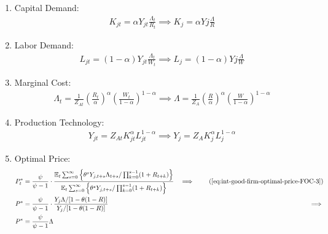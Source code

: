 \documentclass[
thesis.tex
]{subfiles}
\begin{document}
\begin{enumerate}
		\item Capital Demand:
		\begin{align}
			\label{eq:ss-int-good-firm-FOC-Kt}
			K_{jt} = \alpha Y_{jt} \frac{\Lambda_t}{R_t} \implies 
			K_{j} = \alpha Y{j} \frac{\Lambda}{R}
		\end{align}
		
		\item Labor Demand:
		\begin{align}
			\label{eq:ss-int-good-firm-FOC-Lt}
			L_{jt} = (1-\alpha) Y_{jt} \frac{\Lambda_t}{W_t} \implies 
			L_{j} = (1-\alpha) Y{j} \frac{\Lambda}{W}
		\end{align}
		
		
		\item Marginal Cost:
		\begin{align}
			\label{eq:ss-int-good-firm-MC-2}
			\Lambda_t = \frac{1}{Z_{At}} \left( \frac{R_t}{\alpha} \right)^{\alpha} \left( \frac{W_t}{1-\alpha} \right)^{1-\alpha} \implies
			\Lambda = \frac{1}{Z_{A}} \left( \frac{R}{\alpha} \right)^{\alpha} \left( \frac{W}{1-\alpha} \right)^{1-\alpha}
		\end{align}
		
		\item Production Technology:
		\begin{align}
			\label{eq:ss-int-good-firm-production-function}
			Y_{jt} = Z_{At} K_{jt}^\alpha L_{jt}^{1-\alpha} \implies 
			Y_{j} = Z_{A} K_{j}^\alpha L_{j}^{1-\alpha}
		\end{align}
		
		\item Optimal Price:
		\begin{alignat}{2}
			P_t^\ast &= \frac{\psi}{\psi-1} \cdot \frac{\E \sum_{s=0}^{\infty} \left\{\theta^s Y_{j,t+s} \Lambda_{t+s} / \prod_{k=0}^{s-1}(1+R_{t+k}) \right\}} {\E \sum_{s=0}^{\infty} \left\{ \theta^s Y_{j,t+s} / \prod_{k=0}^{s-1}(1+R_{t+k}) \right\}} &\implies \tag{\ref{eq:int-good-firm-optimal-price-FOC-3}} \\
			P^\ast &= \frac{\psi}{\psi-1} \cdot \frac{ Y_j \Lambda / [1-\theta(1-R)]} {Y_j / [1-\theta(1-R)]} &\implies \nonumber \\
			P^\ast &= \frac{\psi}{\psi-1} \Lambda \label{eq:ss-int-good-firm-optimal-price-FOC-3}
		\end{alignat}
		

\end{enumerate}
\end{document}
